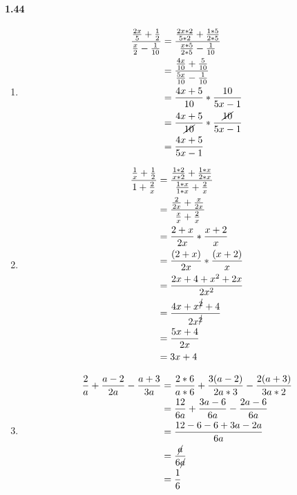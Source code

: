 \documentclass{article}
\newcommand\litem[1]{\item{\bfseries#1\space}}
\begin{document}
\paragraph{1.44}
\begin{enumerate}[label=\emph{\alph*})]
\litem{
  \begin{align*}
    \frac{\frac{2x}{5} + \frac{1}{2}}{\frac{x}{2} - \frac{1}{10}} &= \frac{\frac{2x * 2}{5 * 2} + \frac{1 * 5}{2 * 5}}{\frac{x * 5}{2 * 5} - \frac{1}{10}} \\
    &= \frac{\frac{4x}{10} + \frac{5}{10}}{\frac{5x}{10} - \frac{1}{10}} \\
    &= \frac{4x + 5}{10} * \frac{10}{5x - 1} \\
    &= \frac{4x + 5}{\cancel{10}} * \frac{\cancel{10}}{5x - 1} \\
    &= \frac{4x + 5}{5x -1} 
  \end{align*}
  }
\litem{
\begin{align*}
    \frac{\frac{1}{x} + \frac{1}{2}}{1 + \frac{2}{x}} &= \frac{\frac{1 * 2}{x * 2} + \frac{1 * x}{2 * x}}{\frac{1 * x}{1 * x} + \frac{2}{x}} \\
    &= \frac{\frac{2}{2x} + \frac{x}{2x}}{\frac{x}{x} + \frac{2}{x}} \\
    &= \frac{2 + x}{2x} * \frac{x + 2}{x} \\
    &= \frac{\left(2 + x\right)}{2x} * \frac{\left(x + 2\right)}{x} \\
    &= \frac{2x + 4 + x^2 + 2x}{2x^2} \\
    &= \frac{4x + x^{\cancel{2}} + 4}{2x^{\cancel{2}}} \\
    &= \frac{5x + 4}{2x} \\
    &= 3x + 4
\end{align*}
}
\litem{
\begin{align*}
    \frac{2}{a} + \frac{a - 2}{2a} - \frac{a + 3}{3a} &= \frac{2 * 6}{a * 6} + \frac{3(a - 2)}{2a * 3} - \frac{2(a + 3)}{3a * 2} \\
    &= \frac{12}{6a} + \frac{3a - 6}{6a} - \frac{2a - 6}{6a} \\
    &= \frac{12 - 6 - 6 + 3a - 2a}{6a} \\
    &= \frac{\cancel{a}}{6\cancel{a}} \\
    &= \frac{1}{6}
\end{align*}
}
\end{enumerate}
\end{document}
